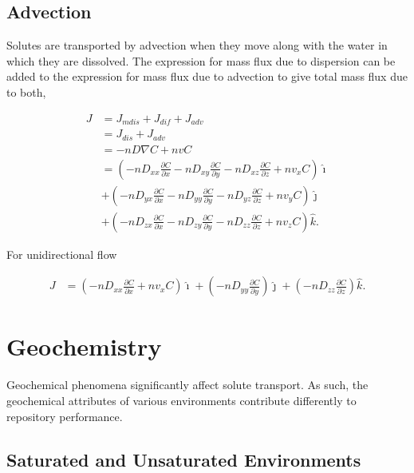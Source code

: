 \documentclass[letterpaper]{article}
\begin{document}
\subsection{Advection}

Solutes are transported by advection when they move along with the water in 
which they are dissolved. The expression for mass flux due to dispersion can be 
added to the expression for mass flux due to advection to give total mass flux 
due to both,

\begin{align}
  J &=  J_{mdis} + J_{dif} + J_{adv}\\
    &=  J_{dis} + J_{adv}\\
    &= -nD\nabla C + nvC\\
    &=\left(-nD_{xx} \frac{\partial C}{\partial x}
            -nD_{xy} \frac{\partial C}{\partial y}
            -nD_{xz} \frac{\partial C}{\partial z}
             + nv_xC \right)\hat{\imath} \nonumber\\
    & + \left(-nD_{yx} \frac{\partial C}{\partial x}
            -nD_{yy} \frac{\partial C}{\partial y}
            -nD_{yz} \frac{\partial C}{\partial z}
            + nv_yC \right)\hat{\jmath} \nonumber\\
    & + \left(-nD_{zx} \frac{\partial C}{\partial x}
            -nD_{zy} \frac{\partial C}{\partial y}
            -nD_{zz} \frac{\partial C}{\partial z}
            + nv_zC \right)\hat{k}.
            \label{jadvdisp}
\end{align}

For unidirectional flow

\begin{align}
  J &=\left(-nD_{xx} \frac{\partial C}{\partial x}
             + nv_xC \right)\hat{\imath}
             + \left( -nD_{yy} \frac{\partial C}{\partial y}
            \right)\hat{\jmath}
            + \left( -nD_{zz} \frac{\partial C}{\partial z}
            \right)\hat{k}.
            \label{jadvdisp}
\end{align}



\section{Geochemistry}

Geochemical phenomena significantly affect solute transport. As such, the 
geochemical attributes of various environments contribute differently to 
repository performance.

\subsection{Saturated and Unsaturated Environments}
\end{document}
